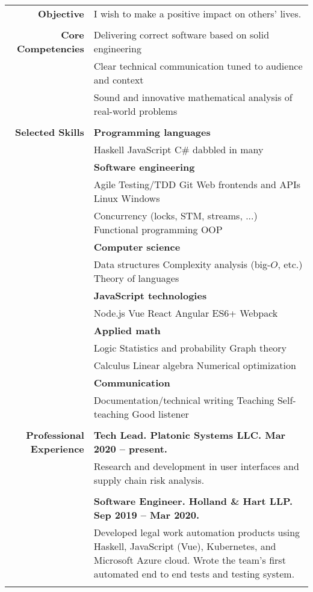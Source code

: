 \documentclass{article}
\newcommand\spc{\hspace{8pt}}
\begin{document}
\bgroup
\begin{tabular}{rl}
  \def\arraystrech{1.5}
  {\bf Objective} & I wish to make a positive impact on others' lives. \\ \\
  {\bf Core Competencies} & Delivering correct software based on solid engineering \\
   & Clear technical communication tuned to audience and context \\
  & Sound and innovative mathematical analysis of real-world problems \\ \\

  {\bf Selected Skills}  & {\bf Programming languages} \\
  & Haskell \spc JavaScript \spc C\# \spc dabbled in many \\
  & {\bf Software engineering} \\
  & Agile \spc Testing/TDD \spc Git \spc Web frontends and APIs \spc Linux \spc Windows \\
  & Concurrency (locks, STM, streams, ...) \spc Functional programming \spc OOP \\
  & {\bf Computer science} \\
  & Data structures \spc Complexity analysis (big-$O$, etc.) \spc Theory of languages \\
  & {\bf JavaScript technologies} \\
  & Node.js \spc Vue \spc React \spc Angular \spc ES6+ \spc Webpack \\
  & {\bf Applied math} \\
  & Logic \spc Statistics and probability \spc Graph theory \\
  & Calculus \spc Linear algebra \spc Numerical optimization \\
  & {\bf Communication} \\
  & Documentation/technical writing \spc Teaching \spc Self-teaching \spc Good listener \\ \\

  {\bf Professional Experience}
  & {\bf Tech Lead. Platonic Systems LLC. Mar 2020 -- present.}\\
  & \parbox{4.5in}{Research and development in user interfaces and supply chain risk analysis.} \\ \\
  & {\bf Software Engineer. Holland \& Hart LLP. Sep 2019 -- Mar 2020.} \\
  & \parbox{4.5in}{Developed legal work automation products using Haskell, JavaScript (Vue), Kubernetes, and Microsoft Azure cloud. Wrote the team's first automated end to end tests and testing system.} \\ \\


\end{tabular}
\end{document}
